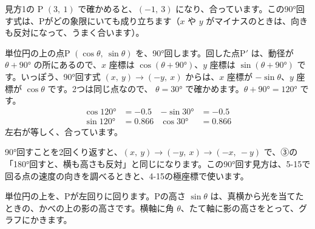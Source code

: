 見方1の P $(3,\ 1)$ で確かめると、$(-1,\ 3)$ になり、合っています。この90°回す式は、Pがどの象限にいても成り立ちます（$x$ や $y$ がマイナスのときは、向きも反対になって、うまく合います）。

単位円の上の点P $(\cos\theta,\ \sin\theta)$ を、90°回します。回した点P$'$ は、動径が $\theta+90°$ の所にあるので、$x$ 座標は $\cos(\theta+90°)$、$y$ 座標は $\sin(\theta+90°)$ です。いっぽう、90°回す式 $(x,\ y)\to(-y,\ x)$ からは、$x$ 座標が $-\sin\theta$、$y$ 座標が $\cos\theta$ です。2つは同じ点なので、
$\theta=30°$ で確かめます。$\theta+90°=120°$ です。
\begin{align*}
\cos120°&=-0.5 & -\sin30°&=-0.5\\
\sin120°&=0.866 & \cos30°&=0.866
\end{align*}
左右が等しく、合っています。

90°回すことを2回くり返すと、$(x,\ y)\to(-y,\ x)\to(-x,\ -y)$ で、③の「180°回すと、横も高さも反対」と同じになります。この90°回す見方は、5-15で回る点の速度の向きを調べるときと、4-15の極座標で使います。


\leavevmode\label{bk:4-8:graph}単位円の上を、Pが左回りに回ります。Pの高さ $\sin\theta$ は、真横から光を当てたときの、かべの上の影の高さです。横軸に角 $\theta$、たて軸に影の高さをとって、グラフにかきます。

